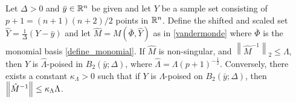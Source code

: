 \documentclass{article}
\begin{document}
\begin{theorem} \label{scale_the_radius}
\label{Lambda_poised_error_bounds_delta}
Let $\Delta >0$ and $\bar{y} \in \mathbb R^n$ be given and  let $Y$ be a sample set consisting of $p+1=(n+1)(n+2)/2$ points in  $\mathbb R^n$.
Define the shifted and scaled set $\hat{Y} = \frac{1}{\Delta} \left(Y-\bar{y}\right)$ and let $\hat{M}=M(\bar{\Phi},\hat{Y})$ as in \cref{vandermonde} where $\bar{\Phi}$ is the monomial basis \cref{define_monomial}.
If $\hat{M}$ is non-singular, and $\left\|{\hat{M}^{-1}}\right\|_2 \le \Lambda$, then $Y$ is $\hat{\Lambda}$-poised in $B_2(\bar{y};\Delta)$,
where $\hat{\Lambda} = \Lambda \left(p+1\right)^{-\frac 1 2}$.
Conversely,  there exists a constant $\kappa_\Lambda > 0$ such that if $Y$ is $\Lambda$-poised on $B_2(\bar{y};\Delta)$, then ${\left\|\hat{M}^{-1}\right\|} \le \kappa_{\Lambda} \Lambda$.
\end{theorem}
\end{document}
